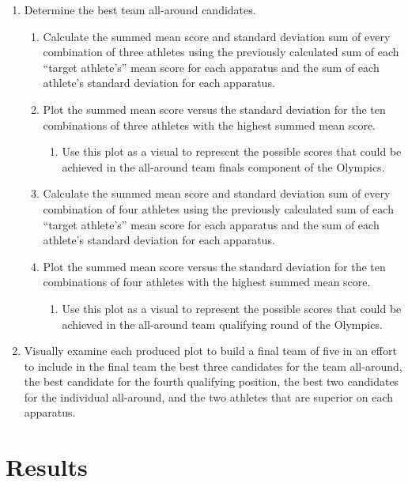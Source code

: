 \documentclass[12pt]{article}
\begin{document}
\begin{enumerate}
\item Determine the best team all-around candidates.
  \begin{enumerate}
   \item Calculate the summed mean score and standard deviation sum of every combination of three athletes using the previously 
   calculated sum of each ``target athlete's'' mean score for each apparatus and the sum of each athlete's standard 
   deviation for each apparatus.
   \item Plot the summed mean score versus the standard deviation for the ten combinations of three athletes with the 
   highest summed mean score.
   \begin{enumerate}
     \item Use this plot as a visual to represent the possible scores that could be achieved in the all-around team finals 
    component of the Olympics.
   \end{enumerate}
   \item Calculate the summed mean score and standard deviation sum of every combination of four athletes using the previously 
   calculated sum of each ``target athlete's'' mean score for each apparatus and the sum of each athlete's standard 
   deviation for each apparatus.
   \item Plot the summed mean score versus the standard deviation for the ten combinations of four athletes with the 
   highest summed mean score.
   \begin{enumerate}
      \item Use this plot as a visual to represent the possible scores that could be achieved in the all-around team qualifying  
     round of the Olympics.
   \end{enumerate}
  \end{enumerate}
  
\item Visually examine each produced plot to build a final team of five in an effort to include in 
    the final team the best three candidates for the team all-around, the best candidate for the fourth qualifying position, 
    the best two candidates for the individual all-around, and the two athletes that are superior on each apparatus.
\end{enumerate}

    


\section{Results}
\label{sec:res}
\end{document}
